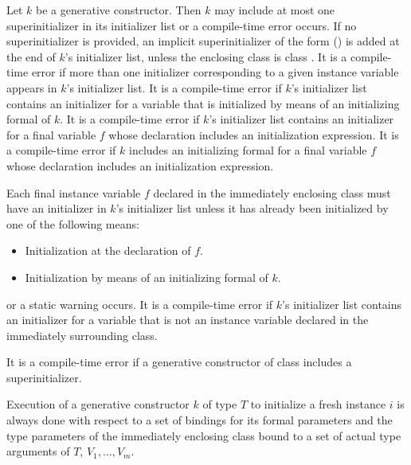 \documentclass{article}
\begin{document}
\LMHash{}
Let $k$ be a generative constructor.
Then $k$ may include at most one superinitializer in its initializer list or a compile-time error occurs.
If no superinitializer is provided, an implicit superinitializer of the form \SUPER{}() is added at the end of $k$'s initializer list,
unless the enclosing class is class .
It is a compile-time error if more than one initializer corresponding to a given instance variable appears in $k$'s initializer list.
It is a compile-time error if $k$'s initializer list contains an initializer for a variable that is initialized by means of an initializing formal of $k$.
It is a compile-time error if $k$'s initializer list contains an initializer for a final variable $f$ whose declaration includes an initialization expression.
It is a compile-time error if $k$ includes an initializing formal for a final variable $f$ whose declaration includes an initialization expression.

\LMHash{}
Each final instance variable $f$ declared in the immediately enclosing class must have an initializer in $k$'s initializer list unless it has already been initialized by one of the following means:
\begin{itemize}
\item Initialization at the declaration of $f$.
\item Initialization by means of an initializing formal of $k$.
\end{itemize}

or a static warning occurs.
It is a compile-time error if $k$'s initializer list contains an initializer for a variable that is not an instance variable declared in the immediately surrounding class.


\LMHash{}
It is a compile-time error if a generative constructor of class  includes a superinitializer.

\LMHash{}
Execution of a generative constructor $k$ of type $T$ to initialize a fresh instance $i$
is always done with respect to a set of bindings for its formal parameters
and the type parameters of the immediately enclosing class bound to a set of actual type arguments of $T$, $V_1, \ldots , V_m$.

\end{document}

